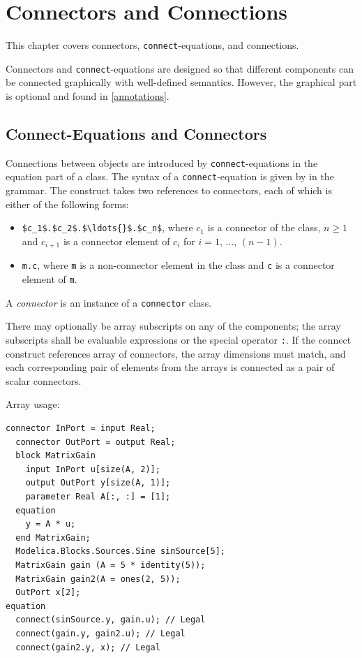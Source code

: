 \chapter{Connectors and Connections}\label{connectors-and-connections}

This chapter covers connectors, \lstinline!connect!-equations, and connections.

Connectors and \lstinline!connect!-equations are designed so that different components can be connected graphically with well-defined semantics.
However, the graphical part is optional and found in \cref{annotations}.

\section{Connect-Equations and Connectors}\label{connect-equations-and-connectors}

Connections between objects are introduced by \lstinline!connect!-equations in the equation part of a class.
The syntax of a \lstinline!connect!-equation is given by  in the grammar.
The construct takes two references to connectors, each of which is either of the following forms:
\begin{itemize}
\item
  \lstinline!$c_1$.$c_2$.$\ldots{}$.$c_n$!, where $c_1$ is a connector of the class, $n \geq 1$ and $c_{i+1}$ is a connector element of $c_i$ for $i = 1,\, \ldots,\, (n - 1)$.
\item
  \lstinline!m.c!, where \lstinline!m! is a non-connector element in the class and \lstinline!c! is a connector element of \lstinline!m!.
\end{itemize}

\begin{nonnormative}
A \emph{connector} is an instance of a \lstinline!connector! class.
\end{nonnormative}

There may optionally be array subscripts on any of the components; the array subscripts shall be evaluable expressions or the special operator \lstinline!:!.
If the connect construct references array of connectors, the array dimensions must match, and each corresponding pair of elements from the arrays is connected as a pair of scalar connectors.

\begin{example}
Array usage:
\begin{lstlisting}[language=modelica]
  connector InPort = input Real;
  connector OutPort = output Real;
  block MatrixGain
    input InPort u[size(A, 2)];
    output OutPort y[size(A, 1)];
    parameter Real A[:, :] = [1];
  equation
    y = A * u;
  end MatrixGain;
  Modelica.Blocks.Sources.Sine sinSource[5];
  MatrixGain gain (A = 5 * identity(5));
  MatrixGain gain2(A = ones(2, 5));
  OutPort x[2];
equation
  connect(sinSource.y, gain.u); // Legal
  connect(gain.y, gain2.u); // Legal
  connect(gain2.y, x); // Legal
\end{lstlisting}
\end{example}

